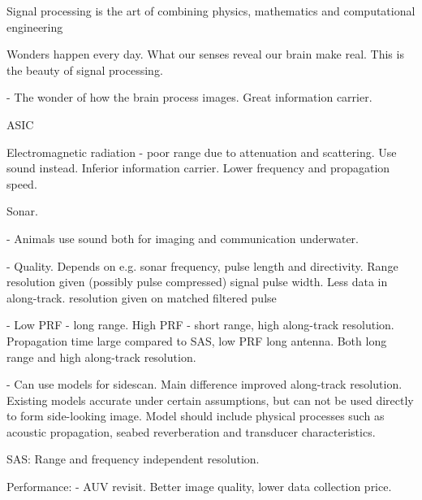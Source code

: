 Signal processing is the art of combining physics, mathematics and computational engineering 

Wonders happen every day. What our senses reveal our brain make real. This is the beauty of signal processing.

- The wonder of how the brain process images. Great information carrier.

\gls{ASIC}

Electromagnetic radiation - poor range due to attenuation and scattering. Use sound instead. Inferior information carrier. Lower frequency and propagation speed.

Sonar. 

- Animals use sound both for imaging and communication underwater.

- Quality. Depends on e.g. sonar frequency, pulse length and directivity. Range resolution given (possibly pulse compressed) signal pulse width. Less data in along-track. resolution given on matched filtered pulse 

- Low PRF - long range. High PRF - short range, high along-track resolution. Propagation time large compared to  SAS, low PRF long antenna. Both long range and high along-track resolution.

- Can use models for sidescan. Main difference improved along-track resolution. Existing models accurate under certain assumptions, but can not be used directly to form side-looking image. Model should include physical processes such as acoustic propagation, seabed reverberation and transducer characteristics.

SAS: Range and frequency independent resolution.


Performance:
- AUV revisit. Better image quality, lower data collection price.


\ifMonolithic\else\fi